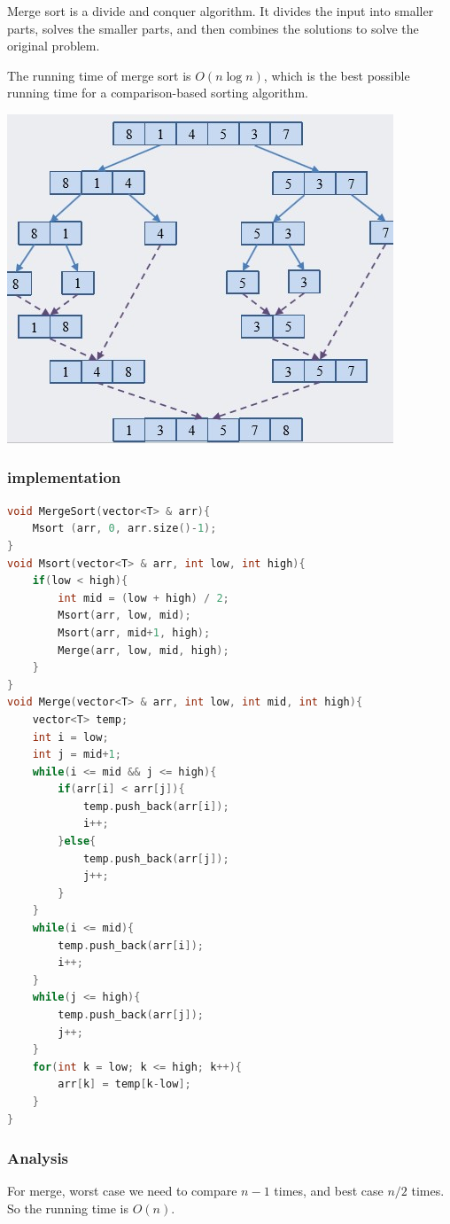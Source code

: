 \documentclass[letterpaper,12pt]{article}
\begin{document}
Merge sort is a divide and conquer algorithm. It divides the input into smaller parts, solves the smaller parts, and then combines the solutions to solve the original problem.

The running time of merge sort is $O(n\log n)$, which is the best possible running time for a comparison-based sorting algorithm.

\includegraphics*{./Images/Merge Sort.jpg}

\subsubsection{implementation}
\begin{lstlisting}[language=C++]
void MergeSort(vector<T> & arr){
    Msort (arr, 0, arr.size()-1);
}
void Msort(vector<T> & arr, int low, int high){
    if(low < high){
        int mid = (low + high) / 2;
        Msort(arr, low, mid);
        Msort(arr, mid+1, high);
        Merge(arr, low, mid, high);
    }
}
void Merge(vector<T> & arr, int low, int mid, int high){
    vector<T> temp;
    int i = low;
    int j = mid+1;
    while(i <= mid && j <= high){
        if(arr[i] < arr[j]){
            temp.push_back(arr[i]);
            i++;
        }else{
            temp.push_back(arr[j]);
            j++;
        }
    }
    while(i <= mid){
        temp.push_back(arr[i]);
        i++;
    }
    while(j <= high){
        temp.push_back(arr[j]);
        j++;
    }
    for(int k = low; k <= high; k++){
        arr[k] = temp[k-low];
    }
}
\end{lstlisting}
\subsubsection{Analysis}
For merge, worst case we need to compare $n-1$ times, and best case $n/2$ times. So the running time is $O(n)$.
\end{document}
